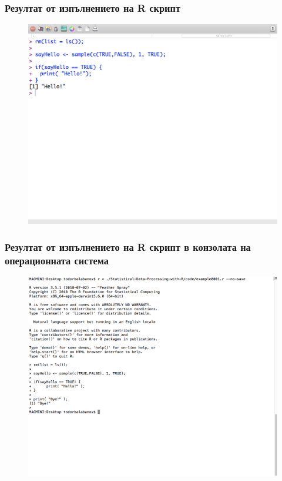 \documentclass{beamer}
\begin{document}
\begin{frame}
\frametitle{Резултат от изпълнението на R скрипт}
\begin{figure}[]\includegraphics[width=\textwidth,height=0.75\textheight]{pic0027}\end{figure}
\end{frame}

\begin{frame}
\frametitle{Резултат от изпълнението на R скрипт в конзолата на операционната система}
\begin{figure}[]\includegraphics[width=\textwidth,height=0.75\textheight]{pic0028}\end{figure}
\end{frame}
\end{document}
